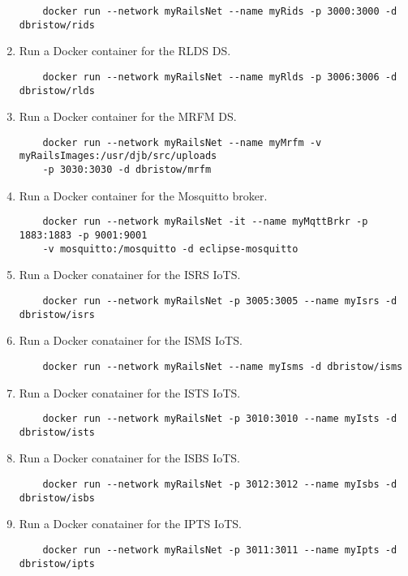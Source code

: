 \begin{enumerate}
    \begin{verbatim}
    docker run --network myRailsNet --name myRids -p 3000:3000 -d dbristow/rids
    \end{verbatim}
    \item Run a Docker container for the \ac{RLDS} \ac{DS}.
    \begin{verbatim}
    docker run --network myRailsNet --name myRlds -p 3006:3006 -d dbristow/rlds
    \end{verbatim}
    \item Run a Docker container for the \ac{MRFM} \ac{DS}.
    \begin{verbatim}
    docker run --network myRailsNet --name myMrfm -v myRailsImages:/usr/djb/src/uploads 
    -p 3030:3030 -d dbristow/mrfm
    \end{verbatim}
    \item Run a Docker container for the Mosquitto broker.
    \begin{verbatim}
    docker run --network myRailsNet -it --name myMqttBrkr -p 1883:1883 -p 9001:9001
    -v mosquitto:/mosquitto -d eclipse-mosquitto
    \end{verbatim}
    \item Run a Docker conatainer for the \ac{ISRS} \ac{IoTS}.
    \begin{verbatim}
    docker run --network myRailsNet -p 3005:3005 --name myIsrs -d dbristow/isrs
    \end{verbatim}
    \item Run a Docker conatainer for the \ac{ISMS} \ac{IoTS}.
    \begin{verbatim}
    docker run --network myRailsNet --name myIsms -d dbristow/isms
    \end{verbatim}
    \item Run a Docker conatainer for the \ac{ISTS} \ac{IoTS}.
    \begin{verbatim}
    docker run --network myRailsNet -p 3010:3010 --name myIsts -d dbristow/ists
    \end{verbatim}
    \item Run a Docker conatainer for the \ac{ISBS} \ac{IoTS}.
    \begin{verbatim}
    docker run --network myRailsNet -p 3012:3012 --name myIsbs -d dbristow/isbs
    \end{verbatim}
    \item Run a Docker conatainer for the \ac{IPTS} \ac{IoTS}.
    \begin{verbatim}
    docker run --network myRailsNet -p 3011:3011 --name myIpts -d dbristow/ipts

\end{verbatim}
\end{enumerate}
